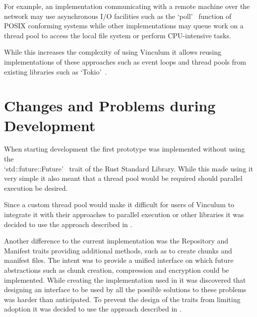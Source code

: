 For example, an implementation communicating with a remote machine over the network
may use asynchronous I/O facilities such as the `poll'~\cite{Posix} function of
POSIX conforming systems while other implementations may queue work on a
thread pool to access the local file system or perform CPU-intensive tasks.

While this increases the complexity of using Vinculum it allows reusing
implementations of these approaches such as event loops and thread pools from
existing libraries such as `Tokio'~\cite{Tokio}.

\section{Changes and Problems during Development}\label{sec:changes}

When starting development the first prototype was implemented without using the \\
`std::future::Future'~\cite{Rust-Docs} trait of the Rust Standard Library.
While this made using it very simple it also meant that a thread pool would be
required should parallel execution be desired.

Since a custom thread pool would make it difficult for users of Vinculum to
integrate it with their approaches to parallel execution or other libraries it
was decided to use the approach described in .

Another difference to the current implementation was the Repository and Manifest
traits providing additional methods, such as to create chunks and manifest files.
The intent was to provide a unified interface on which future abstractions such
as chunk creation, compression and encryption could be implemented.
While creating the implementation used in  it was discovered
that designing an interface to be used by all the possible solutions to these
problems was harder than anticipated.
To prevent the design of the traits from limiting adoption it was decided to
use the approach described in .
